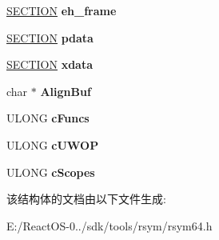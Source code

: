 \begin{DoxyCompactItemize}
\mbox{\label{struct_f_i_l_e___i_n_f_o_ad05b8f50ef1f01df168a4c8b538d8149}} 
\hyperlink{struct_s_e_c_t_i_o_n}{S\+E\+C\+T\+I\+ON} {\bfseries eh\+\_\+frame}
\item 
\mbox{\label{struct_f_i_l_e___i_n_f_o_afe8d49e80aaaf23b4d202d50667398a4}} 
\hyperlink{struct_s_e_c_t_i_o_n}{S\+E\+C\+T\+I\+ON} {\bfseries pdata}
\item 
\mbox{\label{struct_f_i_l_e___i_n_f_o_af61d792e6ed20b66f80baf5846cfa4c4}} 
\hyperlink{struct_s_e_c_t_i_o_n}{S\+E\+C\+T\+I\+ON} {\bfseries xdata}
\item 
\mbox{\label{struct_f_i_l_e___i_n_f_o_a61a5da426279da89b7e6472490028eae}} 
char $\ast$ {\bfseries Align\+Buf}
\item 
\mbox{\label{struct_f_i_l_e___i_n_f_o_a657d066004b41263d4c41bd5486b1719}} 
U\+L\+O\+NG {\bfseries c\+Funcs}
\item 
\mbox{\label{struct_f_i_l_e___i_n_f_o_ae3c0cfedc7f841e78e1af191ab0b7d65}} 
U\+L\+O\+NG {\bfseries c\+U\+W\+OP}
\item 
\mbox{\label{struct_f_i_l_e___i_n_f_o_afd714dd32969928ac3e029ea25f1b8b7}} 
U\+L\+O\+NG {\bfseries c\+Scopes}
\end{DoxyCompactItemize}


该结构体的文档由以下文件生成\+:\begin{DoxyCompactItemize}
\item 
E\+:/\+React\+O\+S-\/0../sdk/tools/rsym/rsym64.\+h\end{DoxyCompactItemize}
